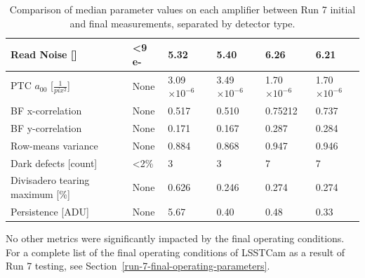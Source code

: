\begin{table}[ht]
{\begin{tabular}{|l|l|ll|ll|}
Read Noise {[}{]}           &                      <9 e-        & \multicolumn{1}{l|}{5.32}              &      5.40      & \multicolumn{1}{l|}{6.26}              &      6.21     \\ \hline
PTC $a_{00}$ [$\frac{1}{pix^2}$]  &      None                          & \multicolumn{1}{l|}{3.09$\times10^{-6}$}              &       3.49$\times10^{-6}$      & \multicolumn{1}{l|}{1.70$\times10^{-6}$}              &        1.70$\times10^{-6}$     \\ \hline
BF x-correlation                  &      None                          & \multicolumn{1}{l|}{0.517}              &     0.510        & \multicolumn{1}{l|}{0.75212}              &       0.737      \\ \hline
BF y-correlation                  &        None                        & \multicolumn{1}{l|}{0.171}              &       0.167      & \multicolumn{1}{l|}{0.287}              &        0.284     \\ \hline
Row-means variance                &       None                         & \multicolumn{1}{l|}{0.884}              &      0.868       & \multicolumn{1}{l|}{0.947}              &        0.946     \\ \hline
Dark defects {[}count{]}          &       <2\%                          & \multicolumn{1}{l|}{3}              &       3      & \multicolumn{1}{l|}{7}              &       7      \\ \hline
Divisadero tearing maximum {[}\%{]} &     None                     & \multicolumn{1}{l|}{0.626}              &       0.246      & \multicolumn{1}{l|}{0.274}              &       0.274      \\ \hline
Persistence {[}ADU{]}             &       None                         & \multicolumn{1}{l|}{5.67}              &       0.40      & \multicolumn{1}{l|}{0.48}              &       0.33      \\ \hline
\end{tabular}
}
\caption{Comparison of median parameter values on each amplifier between Run 7 initial and final measurements, separated by detector type.}
\label{table:FinalChar-paramTable}
\end{table}      



No other metrics were significantly impacted by the final operating conditions. For a complete list of the final operating conditions of LSSTCam as a result of Run 7 testing, see Section~\ref{run-7-final-operating-parameters}.


